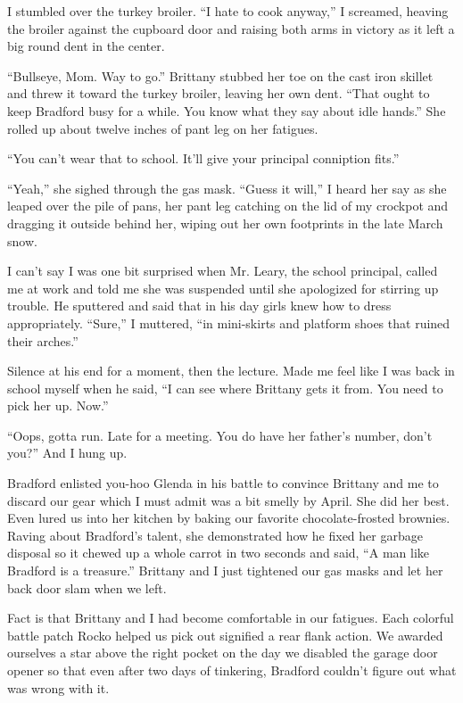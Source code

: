 \documentclass[
]{article}
\begin{document}
I stumbled over the turkey broiler. ``I hate to cook anyway,'' I
screamed, heaving the broiler against the cupboard door and raising both
arms in victory as it left a big round dent in the center.

``Bullseye, Mom. Way to go.'' Brittany stubbed her toe on the cast iron
skillet and threw it to­ward the turkey broiler, leaving her own dent.
``That ought to keep Bradford busy for a while. You know what they say
about idle hands.'' She rolled up about twelve inches of pant leg on her
fatigues.

``You can't wear that to school. It'll give your principal conniption
fits.''

``Yeah,'' she sighed through the gas mask. ``Guess it will,'' I heard
her say as she leaped over the pile of pans, her pant leg catching on
the lid of my crockpot and dragging it outside behind her, wiping out
her own footprints in the late March snow.

I can't say I was one bit surprised when Mr. Leary, the school
principal, called me at work and told me she was suspended until she
apologized for stirring up trouble. He sputtered and said that in his
day girls knew how to dress appropriately. ``Sure,'' I muttered, ``in
mini-skirts and platform shoes that ruined their arches.''

Silence at his end for a moment, then the lecture. Made me feel like I
was back in school my­self when he said, ``I can see where Brittany gets
it from. You need to pick her up. Now.''

``Oops, gotta run. Late for a meeting. You do have her father's number,
don't you?'' And I hung up.

Bradford enlisted you-hoo Glenda in his battle to convince Brittany and
me to discard our gear which I must admit was a bit smelly by April. She
did her best. Even lured us into her kitchen by baking our favorite
chocolate-frosted brownies. Raving about Bradford's talent, she
demonstrated how he fixed her garbage disposal so it chewed up a whole
carrot in two seconds and said, ``A man like Bradford is a treasure.''
Brittany and I just tightened our gas masks and let her back door slam
when we left.

Fact is that Brittany and I had become comfortable in our fatigues. Each
colorful battle patch Rocko helped us pick out signified a rear flank
action. We awarded ourselves a star above the right pocket on the day we
disabled the garage door opener so that even after two days of
tinkering, Brad­ford couldn't figure out what was wrong with it.
\end{document}
